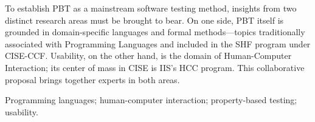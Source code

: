 

To establish PBT as a mainstream software
testing method, insights from two distinct research areas must be
brought to bear.
On one side, PBT itself is grounded in domain-specific languages and
formal methods---topics traditionally associated with Programming
Languages and included in the SHF
program under CISE-CCF.  Usability, on the other hand, is the domain
of Human-Computer Interaction; its center of mass in CISE is IIS's
HCC program.  This collaborative proposal brings together
experts in
both areas\iflater {}\fi.

\smallskip

 Programming languages; human-computer
interaction; property-based testing; usability.

